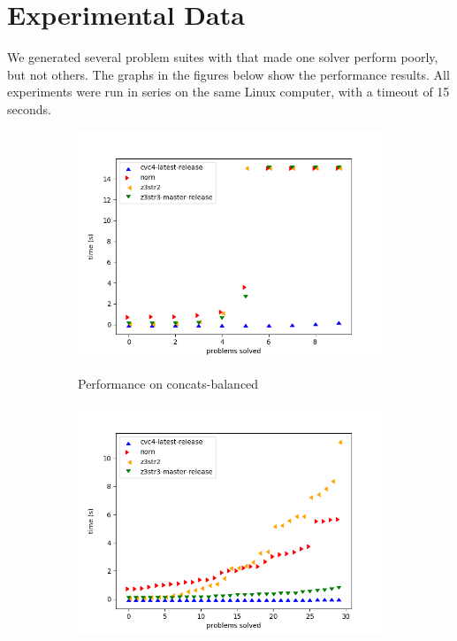 \section{Experimental Data}

    We generated several problem suites with \fuzzer{} that made one solver perform poorly, but not others. The graphs in the figures below show the performance results. All experiments were run in series on the same Linux computer, with a timeout of 15 seconds.

    \begin{figure}[H]
        \begin{subfigure}{.5\textwidth}
            \includegraphics[width=\textwidth]{data/graphs/concats-balanced.png}
            \label{fig:concats-balanced}
            \caption{Performance on concats-balanced}
        \end{subfigure}
        \begin{subfigure}{.5\textwidth}
            \includegraphics[width=\textwidth]{data/graphs/concats-small.png}

\end{subfigure}
\end{figure}
